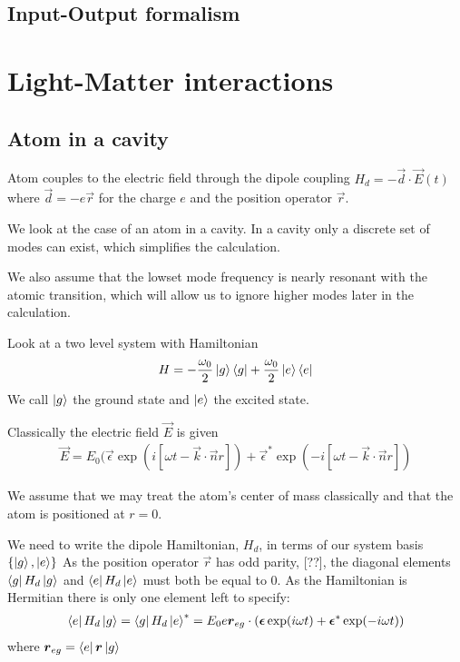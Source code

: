 \subsection{Input-Output formalism}



\section{Light-Matter interactions}

\subsection{Atom in a cavity}

Atom couples to the electric field through the dipole coupling $H_d = -\vec{d}\cdot\vec{E}(t)$ where $\vec{d} = -e \vec{r}$ for the charge $e$ and the position operator $\vec{r}$.

We look at the case of an atom in a cavity. In a cavity only a discrete set of modes can exist, which simplifies the calculation.

We also assume that the lowset mode frequency is nearly resonant with the atomic transition, which will allow us to ignore higher modes later in the calculation.

Look at a two level system with Hamiltonian
\begin{align}
  H = -\frac{\omega_0}{2}\left\vert g\right\rangle\left\langle g\right\vert +\frac{\omega_0}{2}\left\vert e\right\rangle\left\langle e\right\vert
\end{align}
We call $\left\vert g\right\rangle$ the ground state and $\left\vert e\right\rangle$ the excited state. 


Classically the electric field $\vec{E}$ is given
\begin{align}
  \vec{E} = E_0 (\vec{\epsilon}\exp(i[\omega t - \vec{k}\cdot\vec{n}r]) + \vec{\epsilon}^*\exp(-i[\omega t - \vec{k}\cdot\vec{n}r])
\end{align}

We assume that we may treat the atom's center of mass classically and that the atom is positioned at $r=0$.

We need to write the dipole Hamiltonian, $H_d$, in terms of our system basis $\{\left\vert g\right\rangle, \left\vert e\right\rangle\}$
As the position operator $\vec{r}$ has odd parity, [??], the diagonal elements $\left\langle g\right\vert H_d\left\vert g\right\rangle$ and $\left\langle e\right\vert H_d\left\vert e\right\rangle$ must both be equal to $0$. As the Hamiltonian is Hermitian there is only one element left to specify:
\begin{align}
  \left\langle e\right\vert H_d\left\vert g\right\rangle = \left\langle g\right\vert H_d\left\vert e\right\rangle^* = E_0e{\boldsymbol{r}}_{eg}\cdot({\boldsymbol{\epsilon}}\exp(i\omega t) + {\boldsymbol{\epsilon}}^*\exp(-i\omega t))
\end{align}
where ${\boldsymbol{r}}_{eg} = \left\langle e\right\vert{\boldsymbol{r}}\left\vert g\right\rangle$

